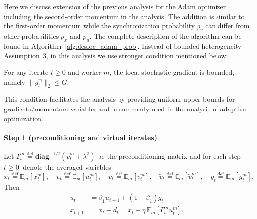 Here we discuss extension of the previous analysis for the Adam optimizer including the second-order momentum in the analysis. The addition is similar to the first-order momentum while the synchronization probability $p_v$ can differ from other probabilities $p_x$ and $p_u$. The complete description of the algorithm can be found in Algorithm~\ref{alg:desloc_adam_prob}. Instead of bounded heterogeneity Assumption~3, in this analysis we use stronger condition mentioned below:

\begin{assumption}
\label{ass:bounded_grad}
For any iterate $t \geq 0$ and worker $m$, the local stochastic gradient is bounded, namely $\|g_t^m\|_2 \leq G$.
\end{assumption}

This condition facilitates the analysis by providing uniform upper bounds for gradients/momentum variables and is commonly used in the analysis of adaptive optimization.

\paragraph{Step 1 (preconditioning and virtual iterates).} Let $\Gamma_t^m \stackrel{\text{def}}{=} \mathbf{diag}^{-1/2}(\tilde{v}_t^m + \lambda^2)$ be the preconditioning matrix and for each step $t \geq 0$, denote the averaged variables
\[
x_t \stackrel{\text{def}}{=} \mathbb{E}_m[x_t^m], \quad
u_t \stackrel{\text{def}}{=} \mathbb{E}_m[u_t^m], \quad
v_t \stackrel{\text{def}}{=} \mathbb{E}_m[v_t^m], \quad
\tilde{v}_t \stackrel{\text{def}}{=} \mathbb{E}_m[\tilde{v}_t^m], \quad
g_t \stackrel{\text{def}}{=} \mathbb{E}_m[g_t^m].
\]
Then
\begin{align*}
u_t &= \beta_1 u_{t-1} + (1-\beta_1) g_t \\
x_{t+1} &= x_t - d_t = x_t - \eta\,\mathbb{E}_m[\Gamma_t^m u_t^m].
\end{align*}


